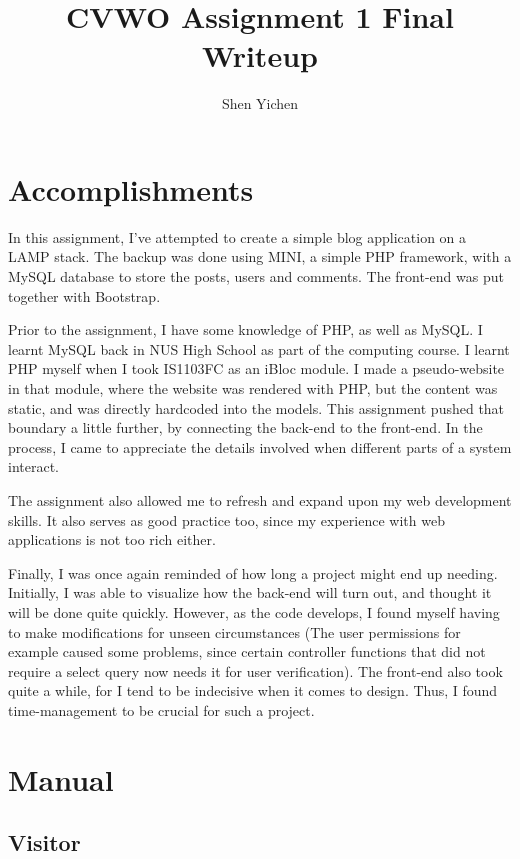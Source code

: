 \documentclass[12pt]{article}
\title{\textbf{\textsf{CVWO Assignment 1 Final Writeup}}}
\date{}
\author{\textsf{Shen Yichen}}
\begin{document}
\maketitle

\section*{Accomplishments}

In this assignment, I've attempted to create a simple blog application on a LAMP stack. The backup was done using MINI, a simple PHP framework, with a MySQL database to store the posts, users and comments. The front-end was put together with Bootstrap.

Prior to the assignment, I have some knowledge of PHP, as well as MySQL\@. I learnt MySQL back in NUS High School as part of the computing course. I learnt PHP myself when I took IS1103FC as an iBloc module. I made a pseudo-website in that module, where the website was rendered with PHP, but the content was static, and was directly hardcoded into the models. This assignment pushed that boundary a little further, by connecting the back-end to the front-end. In the process, I came to appreciate
the details involved when different parts of a system interact.

The assignment also allowed me to refresh and expand upon my web development skills. It also serves as good practice too, since my experience with web applications is not too rich either.

Finally, I was once again reminded of how long a project might end up needing. Initially, I was able to visualize how the back-end will turn out, and thought it will be done quite quickly. However, as the code develops, I found myself having to make modifications for unseen circumstances (The user permissions for example caused some problems, since certain controller functions that did not require a select query now needs it for user verification). The front-end also took quite a while,
for I tend to be indecisive when it comes to design. Thus, I found time-management to be crucial for such a project.

\section*{Manual}

\subsection*{Visitor}
\end{document}
